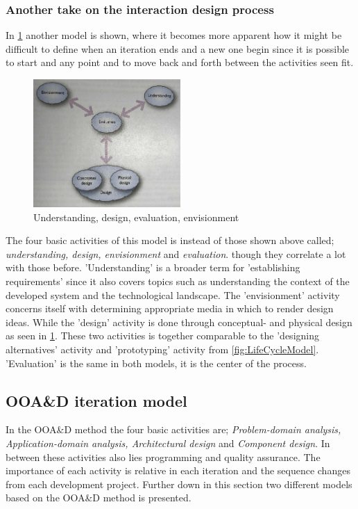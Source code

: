 \subsubsection{Another take on the interaction design process}\label{sec:Iterativedesign2}
In \cref{fig:DEBModel} another model is shown, where it becomes more apparent how it might be difficult to define when an iteration ends and a new one begin since it is possible to start and any point and to move back and forth between the activities seen fit.

\begin{figure}[H]
	\centering
	\includegraphics[width=0.5\textwidth]{billeder/DEBModel.png}
	\caption{Understanding, design, evaluation, envisionment \citep[p.~49]{Benyon}}\label{fig:DEBModel}
\end{figure}

The four basic activities of this model is instead of those shown above called; \textit{understanding, design, envisionment} and \textit{evaluation}.
though they correlate a lot with those before. 
'Understanding' is a broader term for 'establishing requirements' since it also covers topics such as understanding the context of the developed system and the technological landscape.
The 'envisionment' activity concerns itself with determining appropriate media in which to render design ideas.
While the 'design' activity is done through conceptual- and physical design as seen in \cref{fig:DEBModel}.
These two activities is together comparable to the 'designing alternatives' activity and 'prototyping' activity from \cref{fig:LifeCycleModel}.
'Evaluation' is the same in both models, it is the center of the process.

\subsection{OOA\&D iteration model}\label{sec:Iterative2}
In the OOA\&D method the four basic activities are; \textit{Problem-domain analysis, Application-domain analysis, Architectural design} and \textit{Component design}.
In between these activities  also lies programming and quality assurance.
The importance of each activity is relative in each iteration and the sequence changes from each development project.
Further down in this section two different models based on the OOA\&D method is presented.

